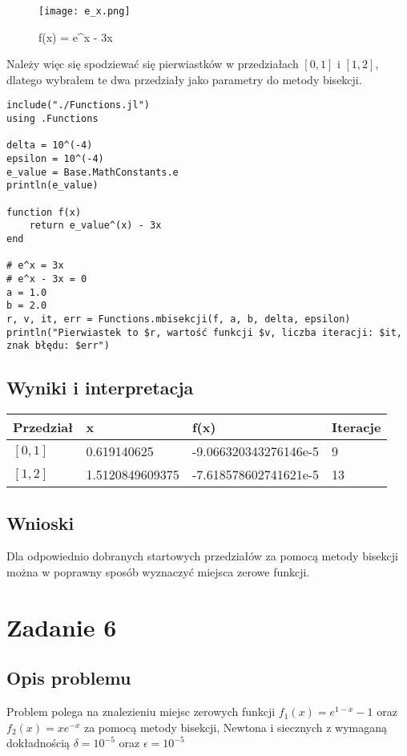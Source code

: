\documentclass{article}
\begin{document}
\begin{figure}[H] 
\centering
\texttt{[image: e\_x.png]}
\caption{f(x) = e^x - 3x}
\label{Zadanie 5}
\end{figure}
\vspace{10pt}
Należy więc się spodziewać się pierwiastków w przedziałach $[0,1]$ i $[1,2]$, dlatego wybrałem te dwa przedziały jako parametry do metody bisekcji.
\begin{verbatim}
include("./Functions.jl")
using .Functions

delta = 10^(-4)
epsilon = 10^(-4)
e_value = Base.MathConstants.e
println(e_value)

function f(x)
    return e_value^(x) - 3x
end

# e^x = 3x
# e^x - 3x = 0
a = 1.0
b = 2.0
r, v, it, err = Functions.mbisekcji(f, a, b, delta, epsilon)
println("Pierwiastek to $r, wartość funkcji $v, liczba iteracji: $it, znak błędu: $err")
\end{verbatim}
\subsection{Wyniki i interpretacja}
\vspace{10pt}
\setlength{\tabcolsep}{2pt}
\renewcommand{\arraystretch}{1.6}
\begin{tabularx}{\textwidth}{|l|Y|Y|l|}
\hline
Przedział & x & f(x) & Iteracje \\
\hline
$[0,1]$ & 0.619140625 & -9.066320343276146e-5 & 9 \\
\hline
$[1,2]$ & 1.5120849609375 & -7.618578602741621e-5 & 13 \\
\hline
\end{tabularx}
\vspace{15pt}
\subsection{Wnioski}
Dla odpowiednio dobranych startowych przedziałów za pomocą metody bisekcji można w poprawny sposób wyznaczyć miejsca zerowe funkcji.
\section{Zadanie 6}
\subsection{Opis problemu}
Problem polega na znalezieniu miejsc zerowych funkcji $f_1(x) = e^{1 - x} - 1 $ oraz $f_2(x) = xe^{-x}$ za pomocą metody bisekcji, Newtona i siecznych z wymaganą dokładnością $\delta = 10^{-5}$ oraz $\epsilon = 10^{-5}$
\end{document}

